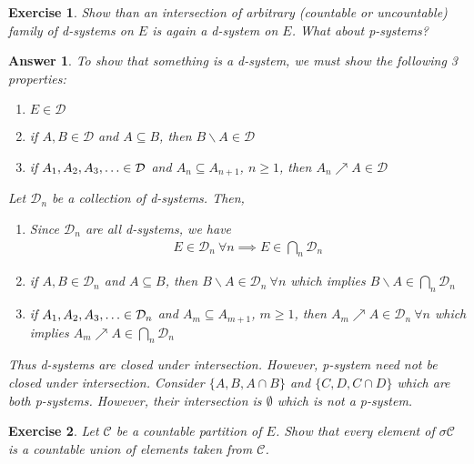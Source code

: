 \documentclass[12pt]{article}
\theoremstyle{colon}
\newtheorem{exercise}{Exercise}
\newtheorem*{answer}{Answer}
\begin{document}
\clearpage

\begin{exercise}
  Show than an intersection of arbitrary (countable or uncountable) family of d-systems on $E$ is again a d-system on $E$. What about p-systems?
\end{exercise}

\begin{answer}
  To show that something is a d-system, we must show the following 3 properties:

  \begin{enumerate}[label=\roman*)]
    \item $E \in \mathcal{D}$
    \item if $A, B \in \mathcal{D}$ and $A \subseteq B$, then $ B \backslash A \in \mathcal{D}$
    \item if $A_1, A_2, A_3, \mathellipsis \in \mathcal{D}$ and $A_n \subseteq A_{n+1}$, $n \geq 1$, then $A_n \nearrow A \in \mathcal{D}$
  \end{enumerate}

  Let $\mathcal{D}_n$ be a collection of d-systems. Then,
  \begin{enumerate}[label=\roman*)]
    \item Since $\mathcal{D}_n$ are all d-systems, we have
      \begin{gather*}
        E \in \mathcal{D}_n \ \forall n \implies E \in \bigcap_n \mathcal{D}_n
      \end{gather*}
    \item if $A, B \in \mathcal{D}_n$ and $A \subseteq B$, then $B \backslash A \in \mathcal{D}_n \ \forall n$ which implies $B \backslash A \in \bigcap_n \mathcal{D}_n$
    \item if $A_1, A_2, A_3, \mathellipsis \in \mathcal{D}_n$ and $A_m \subseteq A_{m+1}$, $m \geq 1$, then $A_m \nearrow A \in \mathcal{D}_n \ \forall n$ which implies $A_m \nearrow A \in \bigcap_n \mathcal{D}_n$
  \end{enumerate}

  Thus d-systems are closed under intersection. However, p-system need not be closed under intersection. Consider $\{ A, B, A \cap B\}$ and $\{ C, D, C \cap D\}$ which are both p-systems. However, their intersection is $\emptyset$ which is not a p-system.
\end{answer}

\clearpage

\begin{exercise}
  Let $\mathcal{C}$ be a countable partition of $E$. Show that every element of $\sigma \mathcal{C}$ is a countable union of elements taken from $\mathcal{C}$.
\end{exercise}
\end{document}
